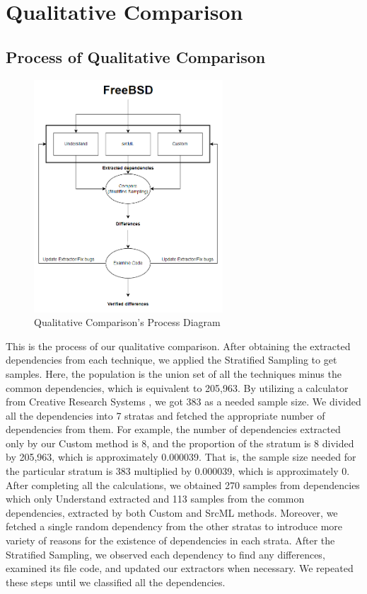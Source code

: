 \documentclass[12pt, dvipsnames, a4paper]{article}
\begin{document}
		\section{Qualitative Comparison}
		\subsection{Process of Qualitative Comparison}
		\begin{figure}[h]
			\center
			\includegraphics[width=200pt]{assets/qualitative_process_diagram.PNG}
			\caption{Qualitative Comparison's Process Diagram}
		\end{figure}
		This is the process of our qualitative comparison. After obtaining the extracted dependencies from each technique, we applied the Stratified Sampling to get samples. Here, the population is the union set of all the techniques minus the common dependencies, which is equivalent to 205,963.
		By utilizing a calculator from Creative Research Systems \cite{calculator}, we got 383 as a needed sample size. We divided all the dependencies into 7 stratas and fetched the appropriate number of dependencies from them.
		For example, the number of dependencies extracted only by our Custom method is 8, and the proportion of the stratum is 8 divided by 205,963, which is approximately 0.000039.
		That is, the sample size needed for the particular stratum is 383 multiplied by 0.000039, which is approximately 0.
		After completing all the calculations, we obtained 270 samples from dependencies which only Understand extracted and 113 samples from the common dependencies, extracted by both Custom and SrcML methods.
		Moreover, we fetched a single random dependency from the other stratas to introduce more variety of reasons for the existence of dependencies in each strata.
		After the Stratified Sampling, we observed each dependency to find any differences, examined its file code, and updated our extractors when necessary. We repeated these steps until we classified all the dependencies.
\end{document}
